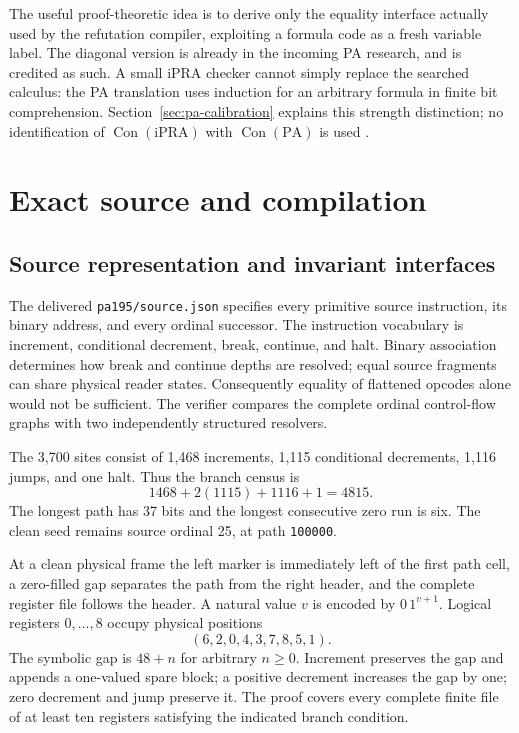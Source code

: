 \documentclass[11pt,letterpaper]{article}
\newcommand{\PA}{\mathrm{PA}}
\newcommand{\Con}{\operatorname{Con}}
\newcommand{\file}[1]{\texttt{\nolinkurl{#1}}}
\newcommand{\code}[1]{\texttt{#1}}
\begin{document}
The useful proof-theoretic idea is to derive only the equality interface
actually used by the refutation compiler, exploiting a formula code as a
fresh variable label. The diagonal version is already in the incoming PA
research, and is credited as such. A small iPRA checker cannot simply
replace the searched calculus: the PA translation uses induction for an
arbitrary formula in finite bit comprehension. Section~\ref{sec:pa-calibration}
explains this strength distinction; no identification of
$\Con(\mathrm{iPRA})$ with $\Con(\PA)$ is used \cite{ipra}.

\section{Exact source and compilation}
\label{sec:source}
\subsection{Source representation and invariant interfaces}
The delivered \file{pa195/source.json} specifies every primitive source
instruction, its binary address, and every ordinal successor. The
instruction vocabulary is increment, conditional decrement, break,
continue, and halt. Binary association determines how break and
continue depths are resolved; equal source fragments can share physical
reader states. Consequently equality of flattened opcodes alone would
not be sufficient. The verifier compares the complete ordinal
control-flow graphs with two independently structured resolvers.

The 3,700 sites consist of 1,468 increments, 1,115 conditional
decrements, 1,116 jumps, and one halt. Thus the branch census is
\[
 1468+2(1115)+1116+1=4815.
\]
The longest path has 37 bits and the longest consecutive zero run is six.
The clean seed remains source ordinal 25, at path \code{100000}.

At a clean physical frame the left marker is immediately left of the
first path cell, a zero-filled gap separates the path from the right
header, and the complete register file follows the header. A natural
value \(v\) is encoded by \(0\,1^{v+1}\).
Logical registers \(0,\ldots,8\) occupy physical positions
\[
 (6,2,0,4,3,7,8,5,1).
\]
The symbolic gap is \(48+n\) for arbitrary \(n\ge0\).
Increment preserves the gap and appends a one-valued spare block;
a positive decrement increases the gap by one; zero decrement and
jump preserve it. The proof covers every complete finite file of at
least ten registers satisfying the indicated branch condition.
\end{document}
